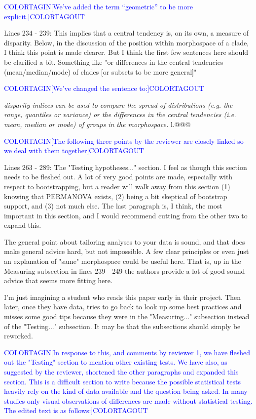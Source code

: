 \documentclass[12pt,letterpaper]{article}
\begin{document}
\textcolor{blue}{COLORTAGIN[We've added the term ``geometric'' to be more explicit.]COLORTAGOUT}

\noindent Lines 234 - 239: This implies that a central tendency is, on its own, a measure of disparity. Below, in the discussion of the position within morphospace of a clade, I think this point is made clearer. But I think the first few sentences here should be clarified a bit. Something like "or differences in the central tendencies (mean/median/mode) of clades [or subsets to be more general]"

\textcolor{blue}{COLORTAGIN[We've changed the sentence to:]COLORTAGOUT}

\textit{disparity indices can be used to compare the spread of distributions (e.g. the range, quantiles or variance) or the differences in the central tendencies (i.e. mean, median or mode) of groups in the morphospace.} l.@@@

\textcolor{blue}{COLORTAGIN[The following three points by the reviewer are closely linked so we deal with them together]COLORTAGOUT}

\noindent Lines 263 - 289: The "Testing hypotheses..." section. I feel as though this section needs to be fleshed out. A lot of very good points are made, especially with respect to bootstrapping, but a reader will walk away from this section (1) knowing that PERMANOVA exists, (2) being a bit skeptical of bootstrap support, and (3) not much else. The last paragraph is, I think, the most important in this section, and I would recommend cutting from the other two to expand this.

\noindent The general point about tailoring analyses to your data is sound, and that does make general advice hard, but not impossible. A few clear principles or even just an explanation of "same" morphospace could be useful here. That is, up in the Measuring subsection in lines 239 - 249 the authors provide a lot of good sound advice that seems more fitting here. 

\noindent I'm just imagining a student who reads this paper early in their project. Then later, once they have data, tries to go back to look up some best practices and misses some good tips because they were in the "Measuring..." subsection instead of the "Testing..." subsection. It may be that the subsections should simply be reworked.

\textcolor{blue}{COLORTAGIN[In response to this, and comments by reviewer 1, we have fleshed out the "Testing" section to mention other existing tests. We have also, as suggested by the reviewer, shortened the other paragraphs and expanded this section. This is a difficult section to write because the possible statistical tests heavily rely on the kind of data available and the question being asked. In many studies only visual observations of differences are made without statistical testing. The edited text is as follows:]COLORTAGOUT}
\end{document}
